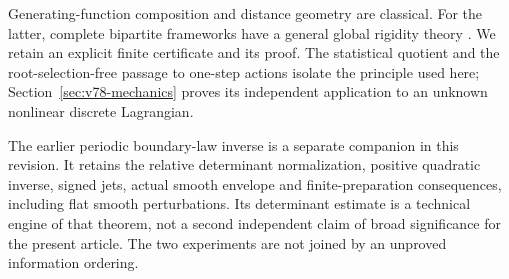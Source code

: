 Generating-function composition and distance geometry are classical.
For the latter, complete bipartite frameworks have a general global
rigidity theory \cite{V77ConnellyGortlerTheran}.  We retain an explicit
finite certificate and its proof.  The statistical quotient and the
root-selection-free passage to one-step actions isolate the principle
used here; Section~\ref{sec:v78-mechanics} proves its independent
application to an unknown nonlinear discrete Lagrangian.

The earlier periodic boundary-law inverse is a separate companion in
this revision.  It retains the relative determinant normalization,
positive quadratic inverse, signed jets, actual smooth envelope and
finite-preparation consequences, including flat smooth perturbations.
Its determinant estimate is a technical engine of that theorem, not a
second independent claim of broad significance for the present article.
The two experiments are not joined by an unproved information ordering.
